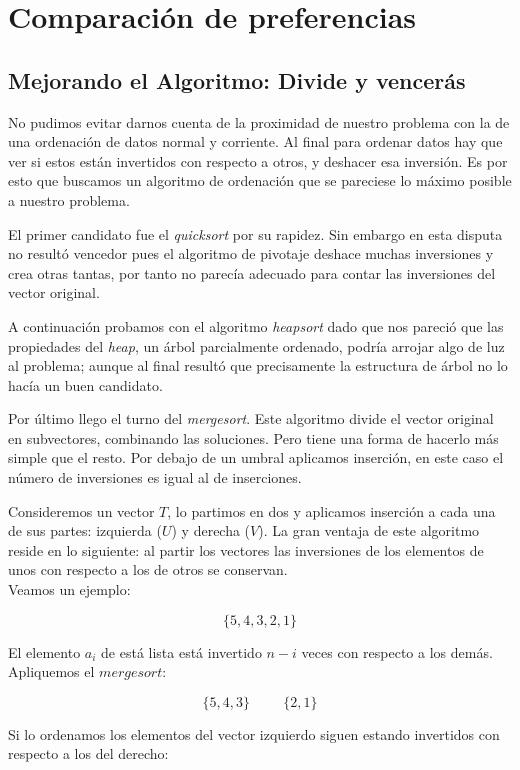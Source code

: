 \section{Comparación de preferencias}
\subsection{Mejorando el Algoritmo: Divide y vencerás}

No pudimos evitar darnos cuenta de la proximidad de nuestro problema con la de una ordenación de datos normal y corriente. Al final para ordenar datos hay que ver si estos están invertidos con respecto a otros, y deshacer esa inversión.
Es por esto que buscamos un algoritmo de ordenación que se pareciese lo máximo posible a nuestro problema.

El primer candidato fue el \textit{quicksort} por su rapidez. Sin embargo en esta disputa no resultó vencedor pues el algoritmo de  pivotaje deshace muchas inversiones y crea otras tantas, por tanto no parecía adecuado para contar las inversiones del vector original. 

A continuación probamos con el algoritmo \textit{heapsort} dado que nos pareció que las propiedades del \textit{heap}, un árbol parcialmente ordenado, podría arrojar algo de luz al problema; aunque al final resultó que precisamente la estructura de árbol no lo hacía un buen candidato.

Por último llego el turno del \textit{mergesort}. Este algoritmo divide el vector original en subvectores, combinando las soluciones. Pero tiene una forma de hacerlo más simple que el resto. 
Por debajo de un umbral aplicamos inserción, en este caso el número de inversiones es igual al de inserciones.

Consideremos un vector $T$, lo partimos en dos y aplicamos inserción a cada una de sus partes: izquierda ($U$) y derecha ($V$). La gran ventaja de este algoritmo reside en lo siguiente:
al partir los vectores las inversiones de los elementos de unos con respecto a los de otros se conservan.
\\

Veamos un ejemplo:

$$ \{5,4,3,2,1\}$$

El elemento $a_i$ de está lista está invertido $n-i$ veces con respecto a los demás. Apliquemos el $mergesort$:

$$ \{5,4,3\} \hspace{1cm} \{2,1\}$$

Si lo ordenamos los elementos del vector izquierdo siguen estando invertidos con respecto a los del derecho:

